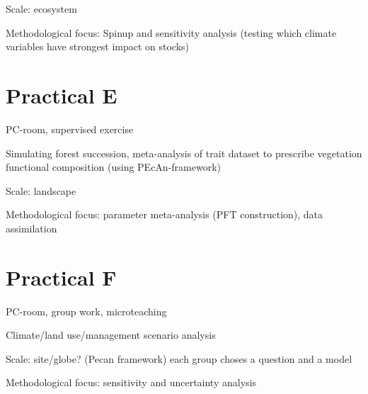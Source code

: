 \documentclass[12pt,oneside]{book}
\begin{document}
Scale: ecosystem

Methodological focus: Spinup and sensitivity analysis (testing which
climate variables have strongest impact on stocks)

\chapter*{Practical E}\label{practical-e}

PC-room, supervised exercise

Simulating forest succession, meta-analysis of trait dataset to
prescribe vegetation functional composition (using PEcAn-framework)

Scale: landscape

Methodological focus: parameter meta-analysis (PFT construction), data
assimilation

\chapter*{Practical F}\label{practical-f}

PC-room, group work, microteaching

Climate/land use/management scenario analysis

Scale: site/globe? (Pecan framework) each group choses a question and a
model

Methodological focus: sensitivity and uncertainty analysis


\end{document}

